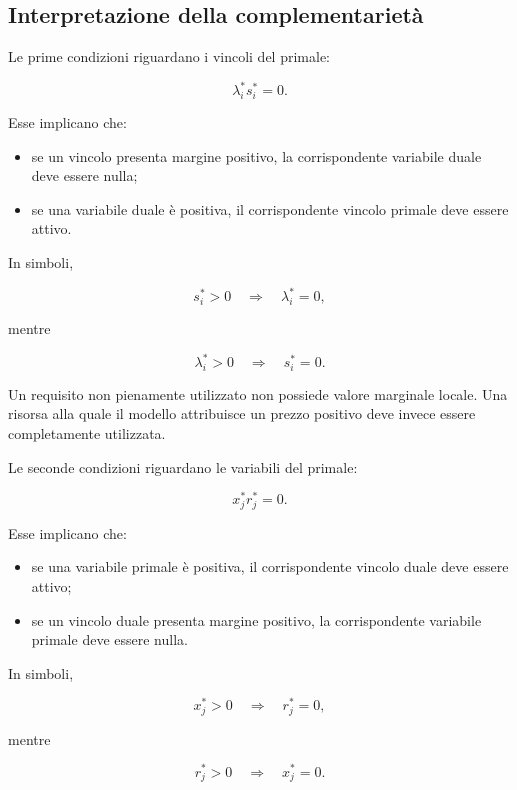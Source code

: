 \subsection{Interpretazione della complementariet\`a}

Le prime condizioni riguardano i vincoli del primale:

\[
\lambda_i^*s_i^*=0.
\]

Esse implicano che:

\begin{itemize}

\item se un vincolo presenta margine positivo, la corrispondente variabile
duale deve essere nulla;

\item se una variabile duale \`e positiva, il corrispondente vincolo primale
deve essere attivo.

\end{itemize}

In simboli,

\[
s_i^*>0
\quad\Longrightarrow\quad
\lambda_i^*=0,
\]

mentre

\[
\lambda_i^*>0
\quad\Longrightarrow\quad
s_i^*=0.
\]

Un requisito non pienamente utilizzato non possiede valore marginale locale.
Una risorsa alla quale il modello attribuisce un prezzo positivo deve invece
essere completamente utilizzata.

Le seconde condizioni riguardano le variabili del primale:

\[
x_j^*r_j^*=0.
\]

Esse implicano che:

\begin{itemize}

\item se una variabile primale \`e positiva, il corrispondente vincolo duale
deve essere attivo;

\item se un vincolo duale presenta margine positivo, la corrispondente
variabile primale deve essere nulla.

\end{itemize}

In simboli,

\[
x_j^*>0
\quad\Longrightarrow\quad
r_j^*=0,
\]

mentre

\[
r_j^*>0
\quad\Longrightarrow\quad
x_j^*=0.
\]

